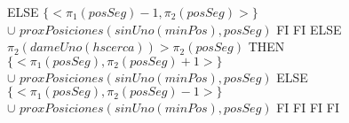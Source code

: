 \documentclass[10pt, a4paper]{article}
\begin{document}
\begin{tad}{}
{{{{{																ELSE 
																	$\{<\pi_1(posSeg)-1,\pi_2(posSeg)>\}$\\
																	$\cup$ $proxPosiciones(sinUno(minPos),posSeg)$
																FI}
															FI}
														ELSE
															{\IF $\pi_2(dameUno(hscerca))>\pi_2(posSeg)$ THEN 
																$\{<\pi_1(posSeg),\pi_2(posSeg)+1>\}$\\
																$\cup$ $proxPosiciones(sinUno(minPos),posSeg)$ 
															ELSE 
																$\{<\pi_1(posSeg),\pi_2(posSeg)-1>\}$\\
																$\cup$ $proxPosiciones(sinUno(minPos),posSeg)$
															FI}
														FI}
													FI} 
												FI}

\end{tad}
\end{document}
